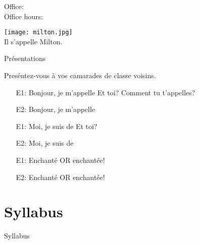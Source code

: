 \documentclass{beamer}
\subtitle[Bienvenue]{Bienvenue}
\begin{document}
  \begin{frame}
    \titlepage
    \tiny{Office: \\
          Office hours: }
  \end{frame}

  \begin{frame}{}
    \begin{center}
      \texttt{[image: milton.jpg]} \\
      Il s'appelle Milton.
    \end{center}
  \end{frame}

  \begin{frame}{Présentations}
    \begin{center}
      Preséntez-vous à vos camarades de classe voisins.\\
    \end{center}
    \begin{itemize}
      \item[E1:] Bonjour, je m'appelle \underline{\hspace{2cm}} Et toi? Comment tu t'appelles?
      \item[E2:] Bonjour, je m'appelle \underline{\hspace{2cm}}
      \item[E1:] Moi, je suis de \underline{\hspace{2cm}} Et toi?
      \item[E2:] Moi, je suis de \underline{\hspace{2cm}}
      \item[E1:] Enchanté OR enchantée!
      \item[E2:] Enchanté OR enchantée!
    \end{itemize}
  \end{frame}

  \section{Syllabus}
  \begin{frame}
    \begin{center}
      \Huge{Syllabus}
    \end{center}
  \end{frame}
\end{document}
